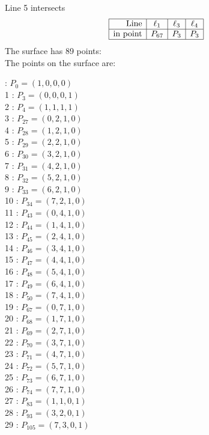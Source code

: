 \documentclass{article}
\begin{document}
{$$$$
Line 5 intersects 
$$
\begin{array}{|r*{3}{|c}|}
\hline
\mbox{Line}  & \ell_{1} & \ell_{3} & \ell_{4}\\
\hline
\mbox{in point}  & P_{67} & P_{3} & P_{3}\\
\hline
\end{array}
$$
The surface has 89 points:\\
The points on the surface are:\\
\begin{multicols}{3}
 : $P_{0}=( 1, 0, 0, 0 )$\\
1 : $P_{3}=( 0, 0, 0, 1 )$\\
2 : $P_{4}=( 1, 1, 1, 1 )$\\
3 : $P_{27}=( 0, 2, 1, 0 )$\\
4 : $P_{28}=( 1, 2, 1, 0 )$\\
5 : $P_{29}=( 2, 2, 1, 0 )$\\
6 : $P_{30}=( 3, 2, 1, 0 )$\\
7 : $P_{31}=( 4, 2, 1, 0 )$\\
8 : $P_{32}=( 5, 2, 1, 0 )$\\
9 : $P_{33}=( 6, 2, 1, 0 )$\\
10 : $P_{34}=( 7, 2, 1, 0 )$\\
11 : $P_{43}=( 0, 4, 1, 0 )$\\
12 : $P_{44}=( 1, 4, 1, 0 )$\\
13 : $P_{45}=( 2, 4, 1, 0 )$\\
14 : $P_{46}=( 3, 4, 1, 0 )$\\
15 : $P_{47}=( 4, 4, 1, 0 )$\\
16 : $P_{48}=( 5, 4, 1, 0 )$\\
17 : $P_{49}=( 6, 4, 1, 0 )$\\
18 : $P_{50}=( 7, 4, 1, 0 )$\\
19 : $P_{67}=( 0, 7, 1, 0 )$\\
20 : $P_{68}=( 1, 7, 1, 0 )$\\
21 : $P_{69}=( 2, 7, 1, 0 )$\\
22 : $P_{70}=( 3, 7, 1, 0 )$\\
23 : $P_{71}=( 4, 7, 1, 0 )$\\
24 : $P_{72}=( 5, 7, 1, 0 )$\\
25 : $P_{73}=( 6, 7, 1, 0 )$\\
26 : $P_{74}=( 7, 7, 1, 0 )$\\
27 : $P_{83}=( 1, 1, 0, 1 )$\\
28 : $P_{93}=( 3, 2, 0, 1 )$\\
29 : $P_{105}=( 7, 3, 0, 1 )$\\

\end{multicols}}
\end{document}
